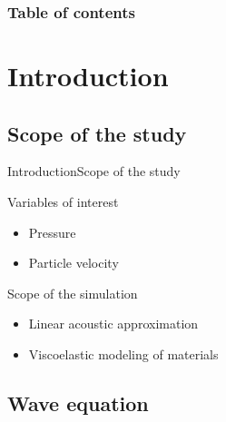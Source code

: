 \documentclass[9pt, xcolor={usenames, dvipsnames}]{beamer}
\begin{document}
		\begin{frame}
			\frametitle{Table of contents}
			\tableofcontents%
		\end{frame}

		\section{Introduction}

			\subsection{Scope of the study}

				\begin{frame}{Introduction}{Scope of the study}
					\centering
					\begin{minipage}{0.6\textwidth}
						\begin{block}{Variables of interest}
							\begin{itemize}
								\item Pressure
								\item Particle velocity
							\end{itemize}
						\end{block}
						\begin{block}{Scope of the simulation}
							\begin{itemize}
								\item Linear acoustic approximation
								\item Viscoelastic modeling of materials
							\end{itemize}
						\end{block}
					\end{minipage}
				\end{frame}

			\subsection{Wave equation}
\end{document}
